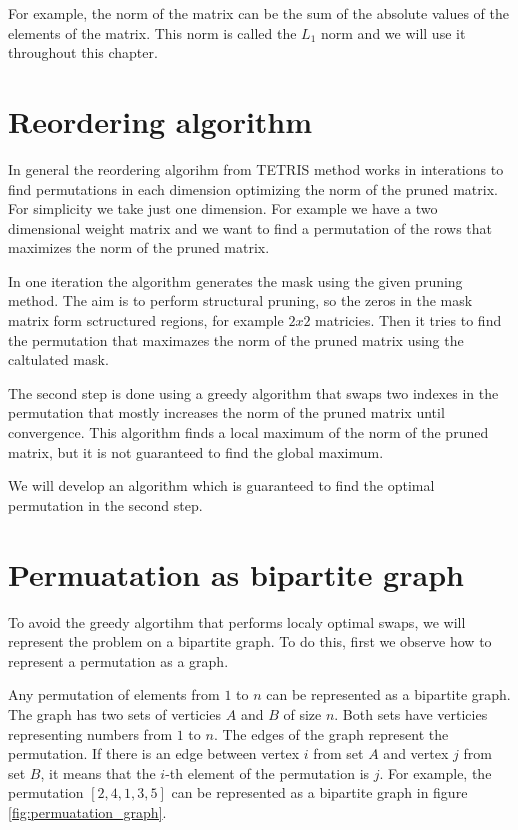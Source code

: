 For example, the norm of the matrix can be the sum of the absolute values of the elements of the matrix. This norm is called the $L_1$ norm and we will use it throughout this chapter.

\section{Reordering algorithm}

In general the reordering algorihm from TETRIS method works in interations to find permutations in each dimension optimizing the norm of the pruned matrix.  For simplicity we take just one dimension. For example we have a two dimensional weight matrix and we want to find a permutation of the rows that maximizes the norm of the pruned matrix.

In one iteration the algorithm generates the mask using the given pruning method. The aim is to perform structural pruning, so the zeros in the mask matrix form sctructured regions, for example $2x2$ matricies. Then it tries to find the permutation that maximazes the norm of the pruned matrix using the caltulated mask.

The second step is done using a greedy algorithm that swaps two indexes in the permutation that mostly increases the norm of the pruned matrix until convergence. This algorithm finds a local maximum of the norm of the pruned matrix, but it is not guaranteed to find the global maximum.

We will develop an algorithm which is guaranteed to find the optimal permutation in the second step.

\section{Permuatation as bipartite graph}
\label{sec:permutation_as_graph}

To avoid the greedy algortihm that performs localy optimal swaps, we will represent the problem on a bipartite graph. To do this, first we observe how to represent a permutation as a graph.

Any permutation of elements from $1$ to $n$ can be represented as a bipartite graph. The graph has two sets of verticies $A$ and $B$ of size $n$. Both sets have verticies representing numbers from $1$ to $n$. The edges of the graph represent the permutation. If there is an edge between vertex $i$ from set $A$ and vertex $j$ from set $B$, it means that the $i$-th element of the permutation is $j$. For example, the permutation $[2, 4, 1, 3, 5]$ can be represented as a bipartite graph in figure \ref{fig:permuatation_graph}.

